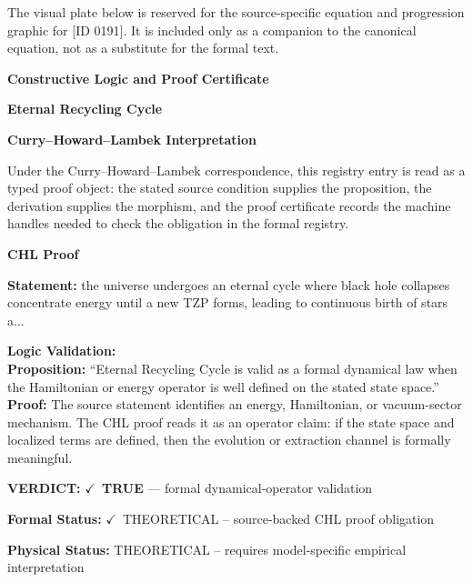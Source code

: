 \begingroup\footnotesize\sloppy
The visual plate below is reserved for the source-specific equation and progression graphic for [ID 0191]. It is included only as a companion to the canonical equation, not as a substitute for the formal text.
\par\endgroup
\ifTZPDarkEdition
{}
\fi

\clearpage
\begingroup\tzpsupportsetup
\noindent\textbf{\fontsize{10.8pt}{12.8pt}\selectfont [ID 0191] Constructive Logic and Proof Certificate}\par
\noindent\textbf{\fontsize{10pt}{12pt}\selectfont Eternal Recycling Cycle}\par
\vspace{0.45em}
\begingroup
\footnotesize
\setlength{\parskip}{0.22em}
\setlength{\parindent}{0pt}
\noindent\textbf{Curry--Howard--Lambek Interpretation}\par
Under the Curry--Howard--Lambek correspondence, this registry entry is read as a typed proof
object: the stated source condition supplies the proposition, the derivation supplies the
morphism, and the proof certificate records the machine handles needed to check the obligation
in the formal registry.

\vspace{0.45em}
\noindent\textbf{CHL Proof}\par
\textbf{Statement:} the universe undergoes an eternal cycle where black hole collapses concentrate energy
until a new TZP forms, leading to continuous birth of stars a...

\textbf{Logic Validation:}\\
\textbf{Proposition:} ``Eternal Recycling Cycle is valid as a formal dynamical law when the Hamiltonian or
energy operator is well defined on the stated state space.''\\
\textbf{Proof:} The source statement identifies an energy, Hamiltonian, or vacuum-sector mechanism. The
CHL proof reads it as an operator claim: if the state space and localized terms are
defined, then the evolution or extraction channel is formally meaningful.

\textbf{VERDICT:} \ensuremath{\checkmark}\ \textbf{TRUE} --- formal dynamical-operator validation

\textbf{Formal Status:} \ensuremath{\checkmark}\ THEORETICAL -- source-backed CHL proof obligation

\textbf{Physical Status:} THEORETICAL -- requires model-specific empirical interpretation
\par\vspace{0.45em}
\par
\ifTZPDarkEdition
{}
\fi
\endgroup
\endgroup
